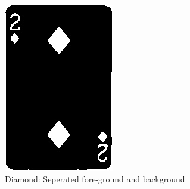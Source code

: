 \documentclass[conference]{IEEEtran}
\begin{document}
\begin{figure}[!htb]
  \centering
  \begin{minipage}[b]{0.2\textwidth}
    \includegraphics[width=\textwidth]{../programme/results/Task_3/diamond/image_0.jpg}
    \caption{Diamond: Seperated fore-ground and background}
    \label{Diamond: Seperated fore-ground and background}
  \end{minipage}
  \hfill
  \begin{minipage}[b]{0.2\textwidth}

\end{minipage}
\end{figure}
\end{document}
